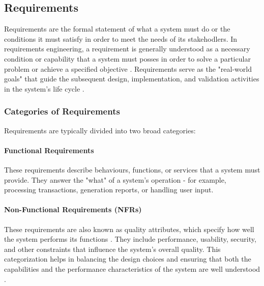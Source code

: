 
\subsection{Requirements}
Requirements are the formal statement of what a system must do or the conditions it must satisfy in order to meet the needs of its stakehodlers. In requirements engineering, a requirement is generally understood as a 
necessary condition or capability that a system must posses in order to solve a particular problem or achieve a specified objective \cite{macaulay2012requirements}. Requirements serve as the 
"real-world goals" that guide the subsequent design, implementation, and validation activities in the system's life cycle \cite{nuseibeh2000requirements}.

\subsubsection{Categories of Requirements}
Requirements are typically divided into two broad categories:
\paragraph{Functional Requirements}
These requirements describe behaviours, functions, or services that a system must provide. They answer the "what" of a system's operation - for example, processing transactions, generation reports, or handling user input.

\paragraph{Non-Functional Requirements (NFRs)}
These requirements are also known as quality attributes, which specify how well the system performs its functions \cite{nuseibeh2000requirements}. They include performance, usability, security, and other constraints that influence
the system's overall quality. This categorization helps in balancing the design choices and ensuring that both the capabilities and the performance characteristics of the system are well understood \cite{nuseibeh2000requirements}.

